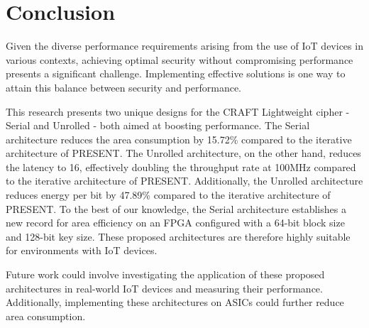 \documentclass[final,5p,times,twocolumn]{elsarticle}
\begin{document}
\section{Conclusion}\label{sec6}

Given the diverse performance requirements arising from the use of IoT devices in various contexts, achieving optimal security without compromising performance presents a significant challenge. Implementing effective solutions is one way to attain this balance between security and performance.

This research presents two unique designs for the CRAFT Lightweight cipher - Serial and Unrolled - both aimed at boosting performance.
The Serial architecture reduces the area consumption by 15.72\% compared to the iterative architecture of PRESENT.
The Unrolled architecture, on the other hand, reduces the latency to 16, effectively doubling the throughput rate at 100MHz compared to the iterative architecture of PRESENT.
Additionally, the Unrolled architecture reduces energy per bit by 47.89\% compared to the iterative architecture of PRESENT.
To the best of our knowledge, the Serial architecture establishes a new record for area efficiency on an FPGA configured with a 64-bit block size and 128-bit key size. 
These proposed architectures are therefore highly suitable for environments with IoT devices.

Future work could involve investigating the application of these proposed architectures in real-world IoT devices and measuring their performance. Additionally, implementing these architectures on ASICs could further reduce area consumption.



\end{document}
